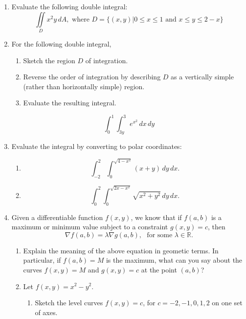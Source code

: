 \documentclass[12pt]{article}
\begin{document}
\begin{enumerate}
\item Evaluate the following double integral:\marginpar{[8]}
\[
 \iint\limits_D x^2y\, dA, \text{ where } D=\{(x,y)| 0\leq x\leq 1 \text{ and } x\leq y\leq 2-x\}
\]
\vspace{3.6in}
\item For the following double integral,
\begin{enumerate}
 \item Sketch the region $D$ of integration.
 \item Reverse the order of integration by describing $D$ as a vertically simple (rather than horizontally simple) region.\marginpar{[10]}
 \item Evaluate the resulting integral. 
\end{enumerate}
\[
 \int_0^1\int_{3y}^{3}e^{x^2}\,dx\,dy
\]
\newpage
\item Evaluate the integral by converting to polar coordinates:
\begin{enumerate}
 \item \[
        \int_{-2}^{2}\int_0^{\sqrt{4-x^2}}(x+y)\,dy\,dx.
       \]\marginpar{[8]}

 \vspace{4in}

 \item \[
        \int_0^2\int_0^{\sqrt{2x-x^2}}\sqrt{x^2+y^2}\,dy\,dx.
       \] \marginpar{[8]}

\end{enumerate}
\newpage
\item Given a differentiable function $f(x,y)$, we know that if $f(a,b)$ is a maximum or minimum value subject to a constraint $g(x,y)=c$, then
\[
 \nabla f(a,b) = \lambda \nabla g(a,b),\,\,\text{ for some } \lambda\in\mathbb{R}.
\]
\begin{enumerate}
 \item Explain the meaning of the above equation in geometic terms.  \marginpar{[4]} In particular, if $f(a,b)=M$ is the maximum, what can you say about the curves $f(x,y)=M$ and $g(x,y)=c$ at the point $(a,b)$?

\vspace{4in}

 \item Let $f(x,y)=x^2-y^2$.
\begin{enumerate}
 \item Sketch the level curves $f(x,y)=c$, for $c=-2,-1,0,1,2$ on one set of axes. \marginpar{[3]} 


\end{enumerate}
\end{enumerate}
\end{enumerate}
\end{document}
